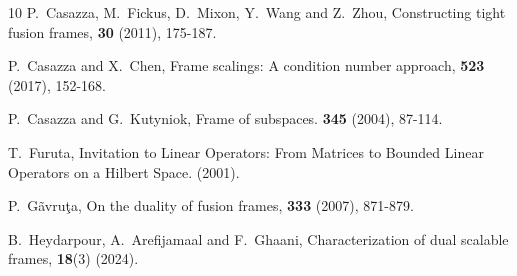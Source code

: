 \documentclass[sn-mathphys-num]{sn-jnl}%
\theoremstyle{definition}
\theoremstyle{remark}
\numberwithin{equation}{section}
\begin{document}
\begin{thebibliography}{10}
P.~Casazza, M.~Fickus, D.~Mixon, Y.~Wang and Z.~Zhou,
\newblock Constructing tight fusion frames,
 \textbf{30} (2011), 175-187.


P.~Casazza and X.~Chen,
\newblock Frame scalings: A condition number approach,
 \textbf{523} (2017), 152-168.





P.~Casazza and G.~Kutyniok,
\newblock Frame of subspaces.
 \textbf{345} (2004), 87-114.



T.~Furuta, 
\newblock Invitation to Linear Operators: From Matrices to Bounded Linear Operators on a Hilbert Space.
  (2001).







P.~G\~{a}vru\c{t}a,
\newblock On the duality of fusion frames,
 \textbf{333} (2007), 871-879.

B.~Heydarpour, A.~Arefijamaal and F.~Ghaani,
\newblock Characterization of dual scalable frames,
 \textbf{18}(3) (2024).



\end{thebibliography}
\end{document}
